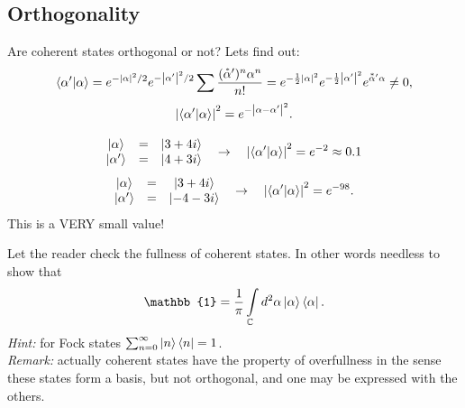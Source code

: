 \subsection{Orthogonality}

Are coherent states orthogonal or not? Lets find out:
\begin{equation}
	\langle {\alpha'} \lvert {\alpha} \rangle = e^{- \left|\alpha\right|^2/2} e^{- \left|\alpha'\right|^2/2} \sum \frac{( \accentset{\ast}{\alpha}' )^n \alpha^n}{n!} = e^{-\frac{1}{2} \left|\alpha\right|^2} e^{-\frac{1}{2} \left|\alpha'\right|^2 } e^{\accentset{\ast}{\alpha}' \alpha} \neq 0,
\end{equation}
\begin{equation}
	\left|\langle {\alpha'} \lvert {\alpha} \rangle\right|^2 = e^{- \left| \alpha - \alpha' \right|^2}.
\end{equation}



\begin{testexample}
	\begin{equation}
	\begin{matrix}
	\left\lvert {\alpha} \right\rangle &=& \left\lvert {3+4i} \right\rangle \\
	\left\lvert {\alpha'} \right\rangle &=& \left\lvert {4+3i} \right\rangle \\
	\end{matrix}
	\quad \to \quad \left|\langle {\alpha'} \lvert {\alpha} \rangle\right|^2 = e^{-2} \approx 0.1
	\end{equation}
	\begin{equation}
	\begin{matrix}
	\left\lvert {\alpha} \right\rangle &=& \left\lvert {3+4i} \right\rangle \\
	\left\lvert {\alpha'} \right\rangle &=& \left\lvert {-4-3i} \right\rangle \\
	\end{matrix}
	\quad \to \quad \left|\langle {\alpha'} \lvert {\alpha} \rangle\right|^2  = e^{-98}.
	\end{equation}
	This is a VERY small value!
\end{testexample}

\begin{hw}
Let the reader check the fullness of coherent states. In other words needless to show that
\begin{equation}
	\mathbb{1} = \frac{1}{\pi} \int \limits_{\mathbb{C}} d^2 \alpha \ket{\alpha} \bra{\alpha}.
\end{equation}
\textit{Hint:} for Fock states $\sum_{n=0}^{\infty} \left\lvert {n} \right\rangle \left\langle {n} \right\rvert = 1$.\\
\textit{Remark:} actually coherent states have the property of overfullness in the sense these states form a basis, but not orthogonal, and one may be expressed with the others.
\end{hw}

